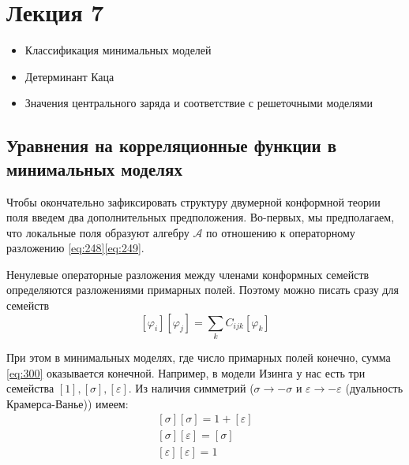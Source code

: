\documentclass[a4paper,12pt]{article}
\theoremstyle{definition}
\theoremstyle{definition}
\theoremstyle{definition}
\begin{document}
\section{Лекция 7}
\label{sec:-7}


  \begin{itemize}
  \item Классификация минимальных моделей
  \item Детерминант Каца
  \item Значения центрального заряда и соответствие с решеточными моделями
  \end{itemize}


\subsection{Уравнения на корреляционные функции в минимальных моделях}
\label{sec:null-fields}

Чтобы окончательно зафиксировать структуру двумерной конформной теории поля введем два
дополнительных предположения. Во-первых, мы предполагаем, что локальные поля образуют алгебру
$\mathcal{A}$ по отношению к операторному разложению \eqref{eq:248}\eqref{eq:249}.


Ненулевые операторные разложения между членами конформных семейств определяются разложениями примарных полей. Поэтому можно писать сразу для семейств
\begin{equation}
  \label{eq:300}
  [\varphi_i][\varphi_j]=\sum_k C_{ijk} [\varphi_k]
\end{equation}

При этом в минимальных моделях, где число примарных полей конечно, сумма \eqref{eq:300} оказывается конечной.
Например, в модели Изинга у нас есть три семейства $[1], [\sigma], [\varepsilon]$. Из наличия симметрий ($\sigma\to - \sigma$ и $\varepsilon\to -\varepsilon$ (дуальность Крамерса-Ванье)) имеем:
\begin{eqnarray}
  \label{eq:301}
  \left[\sigma\right]\left[\sigma\right]=1+\left[\varepsilon\right]\\
  \left[\sigma\right]\left[\varepsilon\right]=\left[\sigma\right]\\
  \left[\varepsilon\right]\left[\varepsilon\right]=1
\end{eqnarray}
\end{document}
